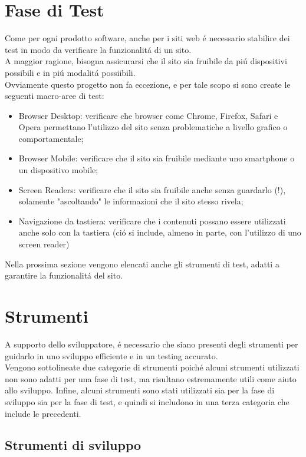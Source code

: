 \documentclass{article}
\begin{document}
\newpage
\section{Fase di Test}
Come per ogni prodotto software, anche per i siti web é necessario stabilire dei test in modo da verificare la funzionalitá di un sito.\\
A maggior ragione, bisogna assicurarsi che il sito sia fruibile da piú dispositivi possibili e in piú modalitá possiibili.\\
Ovviamente questo progetto non fa eccezione, e per tale scopo si sono create le seguenti macro-aree di test:
\begin{itemize}
	\item Browser Desktop: verificare che browser come Chrome, Firefox, Safari e Opera permettano l'utilizzo del sito senza problematiche a livello grafico o comportamentale;
	\item Browser Mobile: verificare che il sito sia fruibile mediante uno smartphone o un dispositivo mobile;
	\item Screen Readers: verificare che il sito sia fruibile anche senza guardarlo (!), solamente "ascoltando" le informazioni che il sito stesso rivela;
	\item Navigazione da tastiera: verificare che i contenuti possano essere utilizzati anche solo con la tastiera (ció si include, almeno in parte, con l'utilizzo di uno screen reader)
\end{itemize}
Nella prossima sezione vengono elencati anche gli strumenti di test, adatti a garantire la funzionalitá del sito.
\section{Strumenti}
A supporto dello sviluppatore, é necessario che siano presenti degli strumenti per guidarlo in uno sviluppo efficiente e in un testing accurato.\\
Vengono sottolineate due categorie di strumenti poiché alcuni strumenti utilizzati non sono adatti per una fase di test, ma risultano estremamente utili come aiuto allo sviluppo. Infine, alcuni strumenti sono stati utilizzati sia per la fase di sviluppo sia per la fase di test, e quindi si includono in una terza categoria che include le precedenti.
\subsection{Strumenti di sviluppo}
\end{document}
